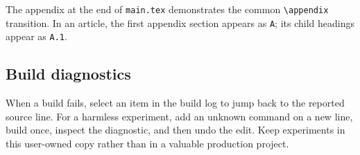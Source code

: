 The appendix at the end of \texttt{main.tex} demonstrates the common
\texttt{\textbackslash appendix} transition. In an article, the first appendix
section appears as \texttt{A}; its child headings appear as \texttt{A.1}.

\subsection{Build diagnostics}
\label{sec:project-workflows:diagnostics}

When a build fails, select an item in the build log to jump back to the
reported source line. For a harmless experiment, add an unknown command on a
new line, build once, inspect the diagnostic, and then undo the edit. Keep
experiments in this user-owned copy rather than in a valuable production
project.
